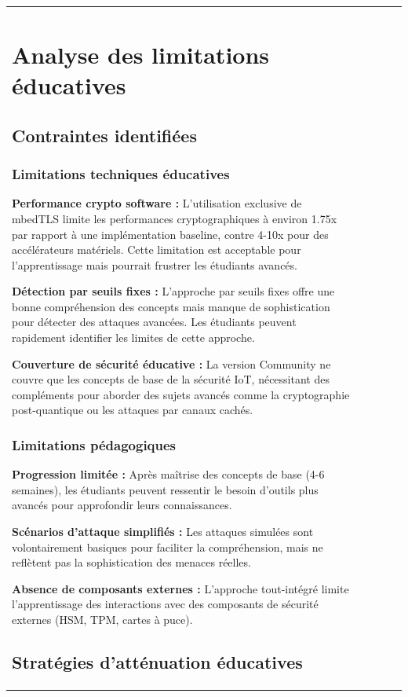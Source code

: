 \begin{table}[h]
\begin{tabular}{|l|c|c|c|c|}
\begin{table}[h]
\begin{table}[h]
\begin{table}[h]
\begin{table}[h]
\begin{table}[h]
\section{Analyse des limitations éducatives}

\subsection{Contraintes identifiées}

\subsubsection{Limitations techniques éducatives}

\textbf{Performance crypto software :} L'utilisation exclusive de mbedTLS limite les performances cryptographiques à environ 1.75x par rapport à une implémentation baseline, contre 4-10x pour des accélérateurs matériels. Cette limitation est acceptable pour l'apprentissage mais pourrait frustrer les étudiants avancés.

\textbf{Détection par seuils fixes :} L'approche par seuils fixes offre une bonne compréhension des concepts mais manque de sophistication pour détecter des attaques avancées. Les étudiants peuvent rapidement identifier les limites de cette approche.

\textbf{Couverture de sécurité éducative :} La version Community ne couvre que les concepts de base de la sécurité IoT, nécessitant des compléments pour aborder des sujets avancés comme la cryptographie post-quantique ou les attaques par canaux cachés.

\subsubsection{Limitations pédagogiques}

\textbf{Progression limitée :} Après maîtrise des concepts de base (4-6 semaines), les étudiants peuvent ressentir le besoin d'outils plus avancés pour approfondir leurs connaissances.

\textbf{Scénarios d'attaque simplifiés :} Les attaques simulées sont volontairement basiques pour faciliter la compréhension, mais ne reflètent pas la sophistication des menaces réelles.

\textbf{Absence de composants externes :} L'approche tout-intégré limite l'apprentissage des interactions avec des composants de sécurité externes (HSM, TPM, cartes à puce).

\subsection{Stratégies d'atténuation éducatives}


\end{table}
\end{table}
\end{table}
\end{table}
\end{table}
\end{tabular}
\end{table}
